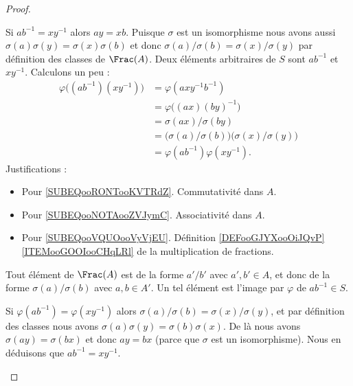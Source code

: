 \begin{proof}
\begin{subproof}

		Si \( ab^{-1}=xy^{-1}\) alors \( ay=xb\). Puisque \( \sigma\) est un isomorphisme nous avons aussi \( \sigma(a)\sigma(y)=\sigma(x)\sigma(b)\) et donc \( \sigma(a)/\sigma(b)=\sigma(x)/\sigma(y)\) par définition des classes de \( \Frac(A)\).
		\spitem[Morphisme]
		Deux éléments arbitraires de \( S\) sont \( ab^{-1}\) et \( xy^{-1}\). Calculons un peu :
		\begin{subequations}
			\begin{align}
				\varphi\big( (ab^{-1})(xy^{-1}) \big) & =\varphi(axy^{-1}b^{-1})      \label{SUBEQooRONTooKVTRdZ}                                          \\
				                                      & =\varphi\big( (ax)(by)^{-1} \big)      \label{SUBEQooNOTAooZVJymC}                                 \\
				                                      & =\sigma(ax)/\sigma(by)                                                                             \\
				                                      & =\big(\sigma(a)/\sigma(b)\big)\big(\sigma(x)/\sigma(y)\big)            \label{SUBEQooVQUOooVyVjEU} \\
				                                      & =\varphi(ab^{-1})\varphi(xy^{-1}).
			\end{align}
		\end{subequations}
		Justifications :
		\begin{itemize}
			\item Pour \eqref{SUBEQooRONTooKVTRdZ}. Commutativité dans \( A\).
			\item Pour \eqref{SUBEQooNOTAooZVJymC}. Associativité dans \( A\).
			\item Pour \eqref{SUBEQooVQUOooVyVjEU}. Définition \ref{DEFooGJYXooOiJQvP}\ref{ITEMooGOOIooCHqLRl} de la multiplication de fractions.
		\end{itemize}


		\spitem[Surjectif]

		Tout élément de \( \Frac(A)\) est de la forme \( a'/b'\) avec \( a',b'\in A\), et donc de la forme \( \sigma(a)/\sigma(b)\) avec \( a,b\in A'\). Un tel élément est l'image par \( \varphi\) de \( ab^{-1}\in S\).

		\spitem[Injectif]

		Si \( \varphi(ab^{-1})=\varphi(xy^{-1})\) alors \( \sigma(a)/\sigma(b)=\sigma(x)/\sigma(y)\), et par définition des classes nous avons \( \sigma(a)\sigma(y)=\sigma(b)\sigma(x)\). De là nous avons \( \sigma(ay)=\sigma(bx)\) et donc \( ay=bx\) (parce que \( \sigma\) est un isomorphisme). Nous en déduisons que \( ab^{-1}=xy^{-1}\).
	\end{subproof}
\end{proof}

